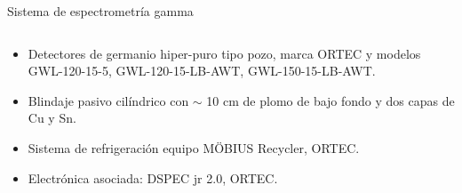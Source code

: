 \documentclass[9pt]{beamer}
\begin{document}
\begin{frame}{Sistema de espectrometría gamma}
\begin{columns}
		\begin{column}{0.48\textwidth}  
			\begin{itemize}
			\justifying
			\item Detectores de germanio hiper-puro tipo pozo, marca ORTEC y modelos GWL-120-15-5, GWL-120-15-LB-AWT, GWL-150-15-LB-AWT. 
			\item Blindaje pasivo cilíndrico con $\sim$ 10 cm de plomo de bajo fondo y dos capas de Cu y Sn.
			\item Sistema de refrigeración equipo MÖBIUS Recycler, ORTEC.
			\item Electrónica asociada: DSPEC jr 2.0, ORTEC.
			\end{itemize}
		\end{column}
	\end{columns}
\end{frame}
\end{document}

